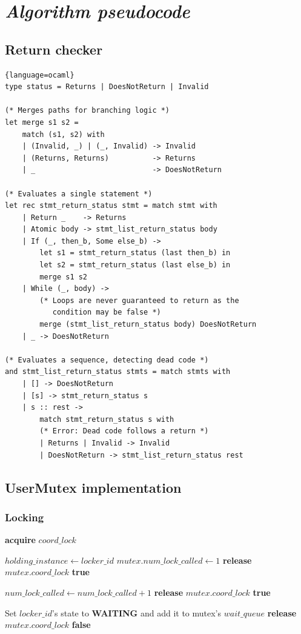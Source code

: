 \documentclass[a4paper,12pt,fleqn]{article}
\begin{document}
\section{\textit{Algorithm pseudocode}}
\subsection{Return checker}
\begin{lstlisting}{language=ocaml}
type status = Returns | DoesNotReturn | Invalid

(* Merges paths for branching logic *)
let merge s1 s2 = 
    match (s1, s2) with
    | (Invalid, _) | (_, Invalid) -> Invalid
    | (Returns, Returns)          -> Returns
    | _                           -> DoesNotReturn

(* Evaluates a single statement *)
let rec stmt_return_status stmt = match stmt with
    | Return _    -> Returns
    | Atomic body -> stmt_list_return_status body
    | If (_, then_b, Some else_b) -> 
        let s1 = stmt_return_status (last then_b) in
        let s2 = stmt_return_status (last else_b) in
        merge s1 s2
    | While (_, body) -> 
        (* Loops are never guaranteed to return as the 
           condition may be false *)
        merge (stmt_list_return_status body) DoesNotReturn
    | _ -> DoesNotReturn

(* Evaluates a sequence, detecting dead code *)
and stmt_list_return_status stmts = match stmts with
    | [] -> DoesNotReturn
    | [s] -> stmt_return_status s
    | s :: rest -> 
        match stmt_return_status s with
        (* Error: Dead code follows a return *)
        | Returns | Invalid -> Invalid 
        | DoesNotReturn -> stmt_list_return_status rest
\end{lstlisting}
\subsection{UserMutex implementation}
\subsubsection{Locking}
\begin{algorithmic}[1]
    \State \textbf{acquire} $coord\_lock$
    
        \State $holding\_instance \gets locker\_id$
        \State $mutex.num\_lock\_called \gets 1$
        \State \textbf{release} $mutex.coord\_lock$
        \State \Return \textbf{true}
    \EndIf

        \State $num\_lock\_called \gets num\_lock\_called + 1$
        \State \textbf{release} $mutex.coord\_lock$
        \State \Return \textbf{true}
    \EndIf

    \State Set $locker\_id$'s state to \textbf{WAITING} and add it to mutex's $wait\_queue$
    \State \textbf{release} $mutex.coord\_lock$
    \State \Return \textbf{false}
\EndProcedure
\end{algorithmic}
\end{document}

